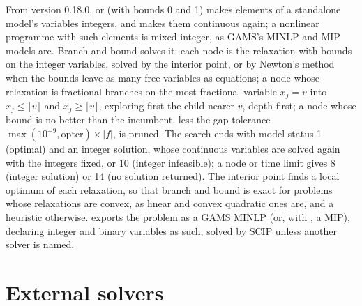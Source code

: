 From version 0.18.0,  or  (with bounds 0
and 1) makes elements of a standalone model's variables integers, and
 makes them continuous again; a nonlinear programme with such
elements is mixed-integer, as GAMS's MINLP and MIP models are. Branch and
bound solves it: each node is the relaxation with bounds on the integer
variables, solved by the interior point, or by Newton's method when the
bounds leave as many free variables as equations; a node whose relaxation is
fractional branches on the most fractional variable $x_j = v$ into $x_j \le
\lfloor v \rfloor$ and $x_j \ge \lceil v \rceil$, exploring first the child
nearer $v$, depth first; a node whose bound is no better than the incumbent,
less the gap tolerance $\max(10^{-9}, \text{optcr}) \times |f|$, is pruned.
The search ends with model status 1 (optimal) and an integer solution, whose
continuous variables are solved again with the integers fixed, or 10
(integer infeasible); a node or time limit gives 8 (integer solution) or 14
(no solution returned). The interior point finds a local optimum of each
relaxation, so that branch and bound is exact for problems whose relaxations
are convex, as linear and convex quadratic ones are, and a heuristic
otherwise.  exports the problem as a GAMS MINLP (or, with
, a MIP), declaring integer and binary variables as such,
solved by SCIP unless another solver is named.

\section{External solvers}\label{sec:extsolvers}

